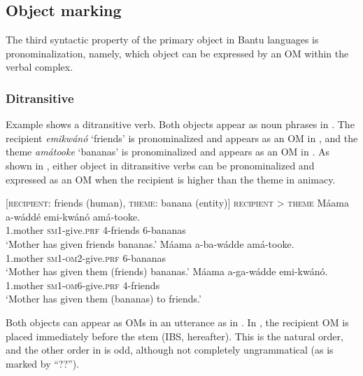 \documentclass[output=paper,
            colorlinks, citecolor=brown
            ,draftmode
		  ]{langscibook}
\begin{document}
\subsection{Object marking}
\label{sec:yoneda:3.3}


The third syntactic property of the primary object in Bantu languages is pronominalization, namely, which object can be expressed by an OM within the verbal complex.



\subsubsection{Ditransitive}
\label{sec:yoneda:3.3.1}

Example  shows a ditransitive verb. Both objects appear as noun phrases in . The recipient \textit{emikwánó} ‘friends’ is pronominalized and appears as an OM in , and the theme \textit{amátooke} ‘bananas’ is pronominalized and appears as an OM in . As shown in , either object in ditransitive verbs can be pronominalized and expressed as an OM when the recipient is higher than the theme in animacy. 


\ea%
    \label{ex:yoneda:27}
    [\textsc{recipient}: friends (human), \textsc{theme}: banana (entity)]  \textsc{recipient} > \textsc{theme}
    \ea\label{ex:yoneda:27a}\gll Máama     a-wáddé         emi-kwánó   amá-tooke.  \\
         1.mother    \textsc{sm1}-give.\textsc{prf}    4-friends      6-bananas\\
    \glt ‘Mother has given friends bananas.’
    \ex\label{ex:yoneda:27b} \gll Máama     a-ba-wádde             amá-tooke.\\
    1.mother    \textsc{sm1-om2}-give.\textsc{prf}    6-bananas\\
    \glt ‘Mother has given them (friends) bananas.’
    \ex\label{ex:yoneda:27c}\gll Máama     a-ga-wádde           emi-kwánó.\\
    1.mother    \textsc{sm1-om6}-give.\textsc{prf}  4-friends \\
    \glt ‘Mother has given them (bananas) to friends.’
    \z
\z



Both objects can appear as OMs in an utterance as in . In , the recipient OM is placed immediately before the stem (IBS, hereafter). This is the natural order, and the other order in  is odd, although not completely ungrammatical (as is marked by “??”).  
\end{document}
